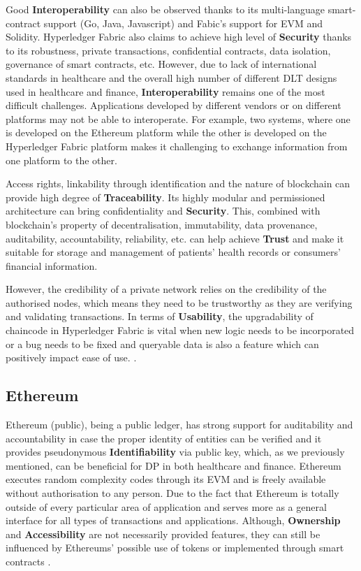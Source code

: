 Good \textbf{Interoperability} can also be observed thanks to its multi-language smart-contract support (Go, Java, Javascript) and Fabic's support for EVM and Solidity. Hyperledger Fabric also claims to achieve high level of \textbf{Security} thanks to its robustness, private transactions, confidential contracts, data isolation, governance of smart contracts, etc. However, due to lack of international standards in healthcare and the overall high number of different DLT designs used in healthcare and finance, \textbf{Interoperability} remains one of the most difficult challenges. Applications developed by different vendors or on different platforms may not be able to interoperate. For example, two systems, where one is developed on the Ethereum platform while the other is developed on the Hyperledger Fabric platform makes it challenging to exchange information from one platform to the other.

Access rights, linkability through identification and the nature of blockchain can provide high degree of \textbf{Traceability}. Its highly modular and permissioned architecture can bring confidentiality and \textbf{Security}. This, combined with blockchain’s property of decentralisation, immutability, data provenance, auditability, accountability, reliability, etc. can help achieve \textbf{Trust} and make it suitable for storage and management of patients' health records or consumers' financial information.

However, the credibility of a private network relies on the credibility of the authorised nodes, which means they need to be trustworthy as they are verifying and validating transactions. In terms of \textbf{Usability}, the upgradability of chaincode in Hyperledger Fabric is vital when new logic needs to be incorporated or a bug needs to be fixed and queryable data is also a feature which can positively impact ease of use. \cite{hyperledger}.


\subsection{Ethereum}
\label{ssec:ethereum}

Ethereum (public), being a public ledger, has strong support for auditability and accountability in case the proper identity of entities can be verified and it provides pseudonymous \textbf{Identifiability} via public key, which, as we previously mentioned, can be beneficial for DP in both healthcare and finance. Ethereum executes random complexity codes through its EVM and is freely available without authorisation to any person. Due to the fact that Ethereum is totally outside of every particular area of application and serves more as a general interface for all types of transactions and applications. Although, \textbf{Ownership} and \textbf{Accessibility} are not necessarily provided features, they can still be influenced by Ethereums' possible use of tokens or implemented through smart contracts \cite{varma2019blockchain, yoo2017blockchain,polyviou2019blockchain}. 

